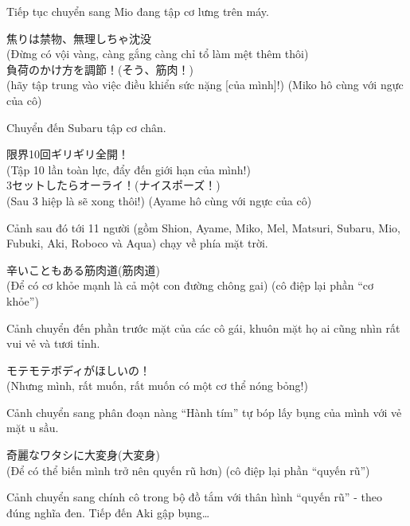 \documentclass[../main.tex]{subfiles}
\begin{document}
Tiếp tục chuyển sang Mio đang tập cơ lưng trên máy.

\begin{dialogue}
   焦りは禁物、無理しちゃ沈没\\(Đừng có vội vàng, càng gắng càng chỉ tổ làm mệt thêm thôi)\\
  負荷のかけ方を調節！(そう、筋肉！)\\(hãy tập trung vào việc điều khiển sức nặng [của mình]!) (Miko hô cùng với ngực của cô)
\end{dialogue}

Chuyển đến Subaru tập cơ chân.

\begin{dialogue}
   {\fotskip 限界10回ギリギリ全開！}\\(Tập 10 lần toàn lực, đẩy đến giới hạn của mình!)\\
  {\fotskip3セットしたらオーライ！(ナイスポーズ！)}\\(Sau 3 hiệp là sẽ xong thôi!) (Ayame hô cùng với ngực của cô)
\end{dialogue}

Cảnh sau đó tới 11 người (gồm Shion, Ayame, Miko, Mel, Matsuri, Subaru, Mio, Fubuki, Aki, Roboco và Aqua) chạy về phía mặt trời.


\begin{dialogue}
   辛いこともある筋肉道(筋肉道)\\(Để có cơ khỏe mạnh là cả một con đường chông gai) (cô điệp lại phần ``cơ khỏe'')
\end{dialogue}

Cảnh chuyển đến phần trước mặt của các cô gái, khuôn mặt họ ai cũng nhìn rất vui vẻ và tươi tỉnh.

\begin{dialogue}
   モテモテボディがほしいの！\\(Nhưng mình, rất muốn, rất muốn có một cơ thể nóng bỏng!)
\end{dialogue}

Cảnh chuyển sang phân đoạn nàng ``Hành tím'' tự bóp lấy bụng của mình với vẻ mặt u sầu.

\begin{dialogue}
   奇麗なワタシに大変身(大変身)\\(Để có thể biến mình trở nên quyến rũ hơn) (cô điệp lại phần ``quyến rũ'')
\end{dialogue}

Cảnh chuyển sang chính cô trong bộ đồ tắm với thân hình ``quyến rũ'' - theo đúng nghĩa đen. Tiếp đến Aki gập bụng\dots
\end{document}
